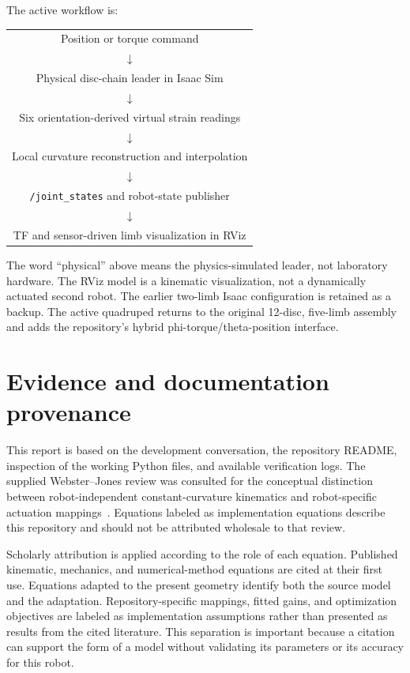 \documentclass[11pt,letterpaper]{article}
\begin{document}
The active workflow is:
\begin{center}
\begin{tabular}{c}
Position or torque command\\$\downarrow$\\
Physical disc-chain leader in Isaac Sim\\$\downarrow$\\
Six orientation-derived virtual strain readings\\$\downarrow$\\
Local curvature reconstruction and interpolation\\$\downarrow$\\
\texttt{/joint\_states} and robot-state publisher\\$\downarrow$\\
TF and sensor-driven limb visualization in RViz
\end{tabular}
\end{center}

The word ``physical'' above means the physics-simulated leader, not laboratory
hardware. The RViz model is a kinematic visualization, not a dynamically
actuated second robot. The earlier two-limb Isaac configuration is retained
as a backup. The active quadruped returns to the original 12-disc, five-limb
assembly and adds the repository's hybrid phi-torque/theta-position interface.

\section{Evidence and documentation provenance}
This report is based on the development conversation, the repository README,
inspection of the working Python files, and available verification logs.
The supplied Webster--Jones review was consulted for the conceptual distinction
between robot-independent constant-curvature kinematics and robot-specific
actuation mappings~\cite{webster2010}. Equations labeled as implementation
equations describe this repository and should not be attributed wholesale
to that review.

Scholarly attribution is applied according to the role of each equation.
Published kinematic, mechanics, and numerical-method equations are cited at
their first use. Equations adapted to the present geometry identify both the
source model and the adaptation. Repository-specific mappings, fitted gains,
and optimization objectives are labeled as implementation assumptions rather
than presented as results from the cited literature. This separation is
important because a citation can support the form of a model without validating
its parameters or its accuracy for this robot.
\end{document}
